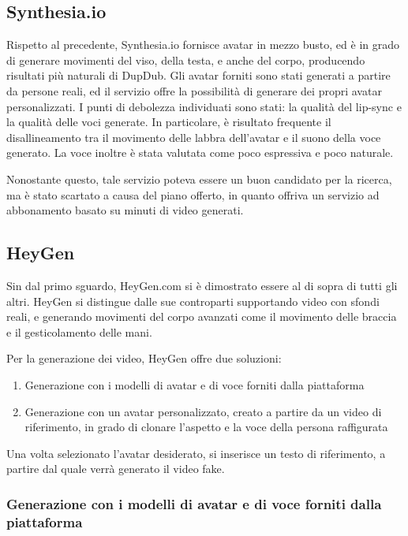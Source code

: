 \subsection{Synthesia.io}

Rispetto al precedente, Synthesia.io fornisce avatar in mezzo busto, ed è in grado di generare movimenti del viso, della testa, e anche del corpo, producendo risultati più naturali di DupDub. Gli avatar forniti sono stati generati a partire da persone reali, ed il servizio offre la possibilità di generare dei propri avatar personalizzati. I punti di debolezza individuati sono stati: la qualità del lip-sync e la qualità delle voci generate. In particolare, è risultato frequente il disallineamento tra il movimento delle labbra dell'avatar e il suono della voce generato. La voce inoltre è stata valutata come poco espressiva e poco naturale.

Nonostante questo, tale servizio poteva essere un buon candidato per la ricerca, ma è stato scartato a causa del piano offerto, in quanto offriva un servizio ad abbonamento basato su minuti di video generati.

\subsection{HeyGen}

Sin dal primo sguardo, HeyGen.com si è dimostrato essere al di sopra di tutti gli altri. HeyGen si distingue dalle sue controparti supportando video con sfondi reali, e generando movimenti del corpo avanzati come il movimento delle braccia e il gesticolamento delle mani.

Per la generazione dei video, HeyGen offre due soluzioni:
\begin{enumerate}
    \item Generazione con i modelli di avatar e di voce forniti dalla piattaforma
    \item Generazione con un avatar personalizzato, creato a partire da un video di riferimento, in grado di clonare l'aspetto e la voce della persona raffigurata
\end{enumerate}

Una volta selezionato l'avatar desiderato, si inserisce un testo di riferimento, a partire dal quale verrà generato il video fake.

\subsubsection{Generazione con i modelli di avatar e di voce forniti dalla piattaforma}

